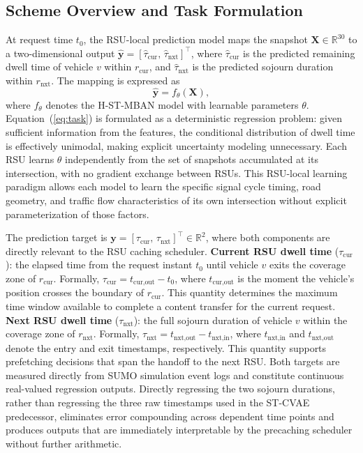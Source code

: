 \documentclass[journal]{IEEEtran}
\begin{document}
\subsection{Scheme Overview and Task Formulation}
\label{sec.net.C}

At request time $t_0$, the RSU-local prediction model maps the snapshot
$\mathbf{X} \in \mathbb{R}^{30}$ to a two-dimensional output
$\hat{\mathbf{y}} = [\hat{\tau}_{\text{cur}},\, \hat{\tau}_{\text{nxt}}]^\top$,
where $\hat{\tau}_{\text{cur}}$ is the predicted remaining dwell time of vehicle $v$
within $r_{\text{cur}}$, and $\hat{\tau}_{\text{nxt}}$ is the predicted sojourn
duration within $r_{\text{nxt}}$.
The mapping is expressed as
\begin{equation}
  \hat{\mathbf{y}} = f_\theta(\mathbf{X}),
  \label{eq:task}
\end{equation}
where $f_\theta$ denotes the H-ST-MBAN model with learnable parameters $\theta$.
Equation~(\ref{eq:task}) is formulated as a deterministic regression problem:
given sufficient information from the features, the conditional distribution of dwell time
is effectively unimodal, making explicit uncertainty modeling unnecessary.
Each RSU learns $\theta$ independently from the set of snapshots accumulated at its
intersection, with no gradient exchange between RSUs.
This RSU-local learning paradigm allows each model to learn the specific
signal cycle timing, road geometry, and traffic flow characteristics of its own
intersection without explicit parameterization of those factors.


The prediction target is $\mathbf{y} = [\tau_{\text{cur}},\, \tau_{\text{nxt}}]^\top
\in \mathbb{R}^2$, where both components are directly relevant to the RSU caching
scheduler.
\textbf{Current RSU dwell time} ($\tau_{\text{cur}}$): the elapsed time from the
request instant $t_0$ until vehicle $v$ exits the coverage zone of $r_{\text{cur}}$.
Formally, $\tau_{\text{cur}} = t_{\text{cur,out}} - t_0$, where $t_{\text{cur,out}}$
is the moment the vehicle's position crosses the boundary of $r_{\text{cur}}$.
This quantity determines the maximum time window available to complete a content
transfer for the current request.
\textbf{Next RSU dwell time} ($\tau_{\text{nxt}}$): the full sojourn duration of
vehicle $v$ within the coverage zone of $r_{\text{nxt}}$.
Formally, $\tau_{\text{nxt}} = t_{\text{nxt,out}} - t_{\text{nxt,in}}$, where
$t_{\text{nxt,in}}$ and $t_{\text{nxt,out}}$ denote the entry and exit timestamps,
respectively.
This quantity supports prefetching decisions that span the handoff to the next RSU.
Both targets are measured directly from SUMO simulation event logs and constitute
continuous real-valued regression outputs.
Directly regressing the two sojourn durations, rather than regressing the three
raw timestamps used in the ST-CVAE predecessor, eliminates error compounding across
dependent time points and produces outputs that are immediately interpretable by the
precaching scheduler without further arithmetic.
\end{document}
